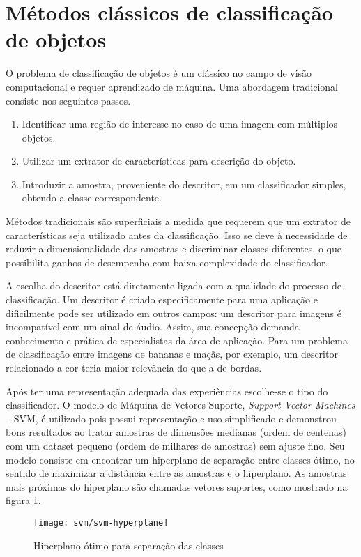 \section{Métodos clássicos de classificação de objetos}
O problema de classificação de objetos é um clássico no campo de visão computacional e requer aprendizado de máquina. Uma abordagem tradicional consiste nos seguintes passos.
	\begin{enumerate}
	\item Identificar uma região de interesse no caso de uma imagem com múltiplos objetos.
	\item Utilizar um extrator de características para descrição do objeto.
	\item Introduzir a amostra, proveniente do descritor, em um classificador simples, obtendo a classe correspondente.
	\end{enumerate}

Métodos tradicionais são superficiais a medida que requerem que um extrator de características seja utilizado antes da classificação. Isso se deve à necessidade de reduzir a dimensionalidade das amostras e discriminar classes diferentes, o que possibilita ganhos de desempenho com baixa complexidade do classificador.

A escolha do descritor está diretamente ligada com a qualidade do processo de classificação. Um descritor é criado especificamente para uma aplicação e dificilmente pode ser utilizado em outros campos: um descritor para imagens é incompatível com um sinal de áudio. Assim, sua concepção demanda conhecimento e prática de especialistas da área de aplicação. Para um problema de classificação entre imagens de bananas e maçãs, por exemplo, um descritor relacionado a cor teria maior relevância do que a de bordas.

Após ter uma representação adequada das experiências escolhe-se o tipo do classificador. O modelo de Máquina de Vetores Suporte, \textit{Support Vector Machines} -- SVM, é utilizado pois possui representação e uso simplificado e demonstrou bons resultados ao tratar amostras de dimensões medianas (ordem de centenas) com um dataset pequeno (ordem de milhares de amostras) sem ajuste fino. Seu modelo consiste em encontrar um hiperplano de separação entre classes ótimo, no sentido de maximizar a distância entre as amostras e o hiperplano. As amostras mais próximas do hiperplano são chamadas vetores suportes, como mostrado na figura \ref{fig:svm-hyperplane}.

\begin{figure}[h]
\centering
\texttt{[image: svm/svm-hyperplane]}
\caption{Hiperplano ótimo para separação das classes}
\label{fig:svm-hyperplane}
\end{figure}

